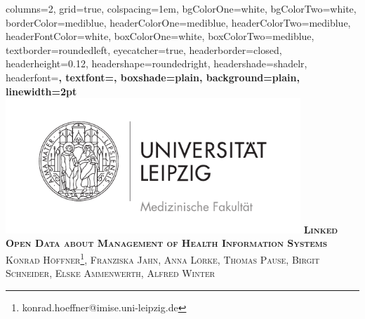 \documentclass[portrait,final,a0paper,fontscale=0.310]{imiseposter}
\begin{document}


\begin{poster}%
  {
  columns=2,
  grid=true,
  colspacing=1em,
  bgColorOne=white,
  bgColorTwo=white,
  borderColor=mediblue,
  headerColorOne=mediblue,
  headerColorTwo=mediblue,
  headerFontColor=white,
  boxColorOne=white,
  boxColorTwo=mediblue,
  textborder=roundedleft,
  eyecatcher=true,
  headerborder=closed,
  headerheight=0.12\textheight,
  headershape=roundedright,
  headershade=shadelr,
  headerfont=\Large\bf\textsc, %
  textfont={\setlength{\parindent}{0em}},
  boxshade=plain,
  background=plain,
  linewidth=2pt
  }
  {\includegraphics[width=30em]{img/medfak.pdf}} 
  {\bf\textsc{Linked Open Data about Management of Health Information Systems}\vspace{0.5em}
  }
  {\textsc{Konrad Höffner\footnote{konrad.hoeffner@imise.uni-leipzig.de}, Franziska Jahn, Anna Lörke, Thomas Pause, Birgit Schneider, Elske
  Ammenwerth, Alfred Winter}}
  {%
  }



\end{poster}
\end{document}
